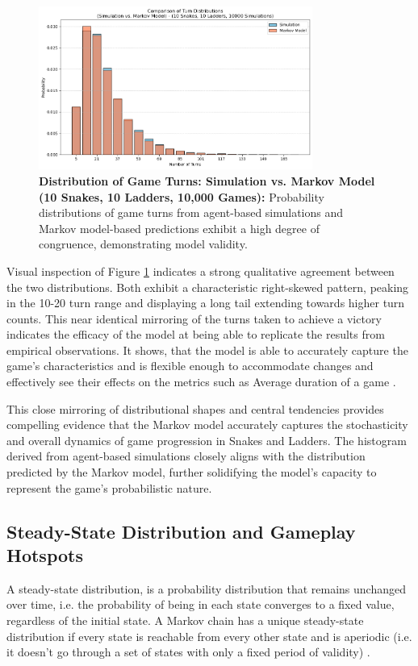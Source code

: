 \begin{figure}[th]
	\centering
	\includegraphics[width=0.8\textwidth]{"../Markov Modelling/Data/FrequencyOveralyed.png"}
	\caption{\textbf{Distribution of Game Turns: Simulation vs. Markov Model (10 Snakes, 10 Ladders, 10,000 Games):} Probability distributions of game turns from agent-based simulations and Markov model-based predictions exhibit a high degree of congruence, demonstrating model validity.}
	\label{fig:frequencydistributionMarkov}
\end{figure}

Visual inspection of Figure \ref{fig:frequencydistributionMarkov} indicates a strong qualitative agreement between the two distributions. Both exhibit a characteristic right-skewed pattern, peaking in the 10-20 turn range and displaying a long tail extending towards higher turn counts. This near identical mirroring of the turns taken to achieve a victory indicates the efficacy of the model at being able to replicate the results from empirical observations. It shows, that the model is able to accurately capture the game's characteristics and is flexible enough to accommodate changes and effectively see their effects on the metrics such as Average duration of a game \autocite{althoenHowLongGame1993a}.

This close mirroring of distributional shapes and central tendencies provides compelling evidence that the Markov model accurately captures the stochasticity and overall dynamics of game progression in Snakes and Ladders. The histogram derived from agent-based simulations closely aligns with the distribution predicted by the Markov model, further solidifying the model's capacity to represent the game's probabilistic nature.

\subsection{Steady-State Distribution and Gameplay Hotspots}
A steady-state distribution, is a probability distribution that remains unchanged over time, i.e. the probability of being in each state converges to a fixed value, regardless of the initial state. A Markov chain has a unique steady-state distribution if every state is reachable from every other state and is aperiodic (i.e. it doesn't go through a set of states with only a fixed period of validity) \autocite{mcgregorCMPSCI240Reasoning}.
 
